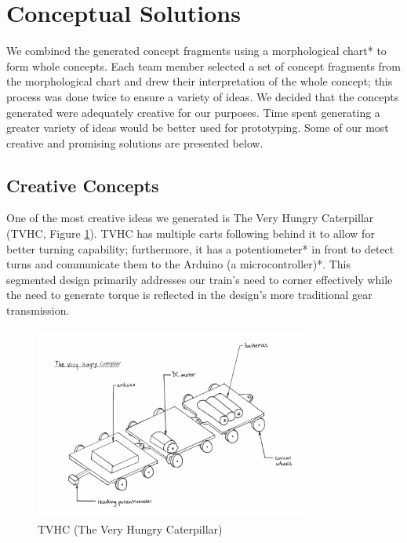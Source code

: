 \documentclass[class=../report, crop=false]{standalone}
\begin{document}
\section{Conceptual Solutions}

We combined the generated concept fragments using a morphological chart* to form whole concepts.
Each team member selected a set of concept fragments from the morphological chart and drew their interpretation of the whole concept; this process was done twice to ensure a variety of ideas.
We decided that the concepts generated were adequately creative for our purposes.
Time spent generating a greater variety of ideas would be better used for prototyping. Some of our most creative and promising solutions are presented below\footnotemark.


\subsection{Creative Concepts}

One of the most creative ideas we generated is The Very Hungry Caterpillar (TVHC, Figure \ref{fig:tvhc}).
TVHC has multiple carts following behind it to allow for better turning capability; furthermore, it has a potentiometer* in front to detect turns and communicate them to the Arduino (a microcontroller)*.
This segmented design primarily addresses our train’s need to corner effectively while the need to generate torque is reflected in the design’s more traditional gear transmission.

\begin{figure}[H]
	\centering
	\includegraphics[width=0.8\textwidth]{../res/img/tvhc}
	\caption{TVHC (The Very Hungry Caterpillar)}
	\label{fig:tvhc}
\end{figure}
\end{document}
